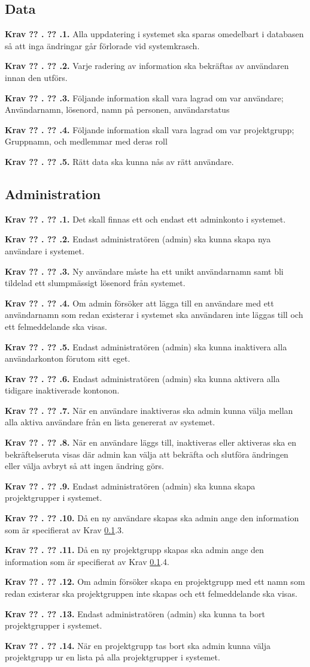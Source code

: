 \documentclass[a4paper]{article}
\newcommand\getcurrentref[1]{%
 \ifnumequal{\value{#1}}{0}
  {??}
  {\the\value{#1}}%
}
\newcommand\requirement[2]{
	\numberedrow{Krav}{#1}{#2}
}
\newcommand\numberedrow[3]{
	\noindent
	\textbf{#1 \getcurrentref{section}.\getcurrentref{subsection}.#2.} #3
	
}
\begin{document}
\subsection{Data}
\label{krav-funk-data}
\requirement{1}{Alla uppdatering i systemet ska sparas omedelbart i databasen så att inga ändringar går förlorade vid systemkrasch.}
\requirement{2}{Varje radering av information ska bekräftas av användaren innan den utförs.}
\requirement{3}{Följande information skall vara lagrad om var användare; Användarnamn, lösenord, namn på personen, användarstatus}
\requirement{4}{Följande information skall vara lagrad om var projektgrupp; Gruppnamn, och medlemmar med deras roll}
\requirement{5}{Rätt data ska kunna nås av rätt användare.}
\subsection{Administration}
\requirement{1}{Det skall finnas ett och endast ett adminkonto i systemet.}
\requirement{2}{Endast administratören (admin) ska kunna skapa nya användare i systemet.}
\requirement{3}{Ny användare måste ha ett unikt användarnamn samt bli tildelad ett slumpmässigt lösenord från systemet.}
\requirement{4}{Om admin försöker att lägga till en användare med ett användarnamn som redan existerar i systemet ska användaren inte läggas till och ett felmeddelande ska visas.}
\requirement{5}{Endast administratören (admin) ska kunna inaktivera alla användarkonton förutom sitt eget.}
\requirement{6}{Endast administratören (admin) ska kunna aktivera alla tidigare inaktiverade kontonon.}
\requirement{7}{När en användare inaktiveras ska admin kunna välja mellan alla aktiva användare från en lista genererat av systemet.}
\requirement{8}{När en användare läggs till, inaktiveras eller aktiveras ska en bekräftelseruta visas där admin kan välja att bekräfta och slutföra ändringen eller välja avbryt så att ingen ändring görs.}
\requirement{9}{Endast administratören (admin) ska kunna skapa projektgrupper i systemet.}
\requirement{10}{Då en ny användare skapas ska admin ange den information som är specifierat av Krav \ref{krav-funk-data}.3.}
\requirement{11}{Då en ny projektgrupp skapas ska admin ange den information som är specifierat av Krav \ref{krav-funk-data}.4.}
\requirement{12}{Om admin försöker skapa en projektgrupp med ett namn som redan existerar ska projektgruppen inte skapas och ett felmeddelande ska visas.}
\requirement{13}{Endast administratören (admin) ska kunna ta bort projektgrupper i systemet.}
\requirement{14}{När en projektgrupp tas bort ska admin kunna välja projektgrupp ur en lista på alla projektgrupper i systemet.}
\end{document}
